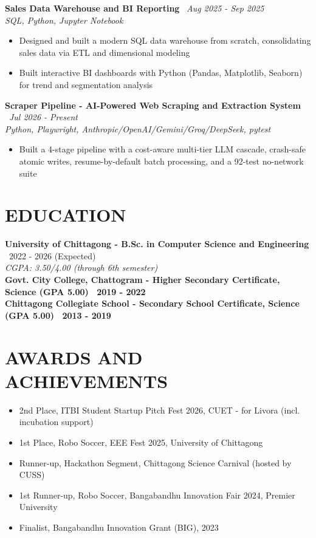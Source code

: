 \documentclass[10.5pt,a4paper]{article}
\newenvironment{tightitemize}{
  \begin{itemize}[leftmargin=15pt, itemsep=1pt, parsep=0pt, topsep=2pt]
}{
  \end{itemize}
}
\newcommand{\entry}[3]{%
  \textbf{#1} \textbar\ #2\\
  \textit{#3}%
}
\newcommand{\entrysimple}[2]{%
  \textbf{#1} \textbar\ \textit{#2}\\[1pt]
}
\newcommand{\entrybold}[2]{%
  \textbf{#1 \textbar\ #2}%
}
\begin{document}
\entrysimple{Sales Data Warehouse and BI Reporting}{Aug 2025 - Sep 2025}
\textit{SQL, Python, Jupyter Notebook}
\begin{tightitemize}
  \item Designed and built a modern SQL data warehouse from scratch, consolidating sales data via ETL and dimensional modeling
  \item Built interactive BI dashboards with Python (Pandas, Matplotlib, Seaborn) for trend and segmentation analysis
\end{tightitemize}

\entrysimple{Scraper Pipeline - AI-Powered Web Scraping and Extraction System}{Jul 2026 - Present}
\textit{Python, Playwright, Anthropic/OpenAI/Gemini/Groq/DeepSeek, pytest}
\begin{tightitemize}
  \item Built a 4-stage pipeline with a cost-aware multi-tier LLM cascade, crash-safe atomic writes, resume-by-default batch processing, and a 92-test no-network suite
\end{tightitemize}

\section*{EDUCATION}
\entry{University of Chittagong - B.Sc. in Computer Science and Engineering}{2022 - 2026 (Expected)}{CGPA: 3.50/4.00 (through 6th semester)}\\[4pt]
\entrybold{Govt. City College, Chattogram - Higher Secondary Certificate, Science (GPA 5.00)}{2019 - 2022}\\[2pt]
\entrybold{Chittagong Collegiate School - Secondary School Certificate, Science (GPA 5.00)}{2013 - 2019}

\section*{AWARDS AND ACHIEVEMENTS}
\begin{tightitemize}
  \item 2nd Place, ITBI Student Startup Pitch Fest 2026, CUET - for Livora (incl. incubation support)
  \item 1st Place, Robo Soccer, EEE Fest 2025, University of Chittagong
  \item Runner-up, Hackathon Segment, Chittagong Science Carnival (hosted by CUSS)
  \item 1st Runner-up, Robo Soccer, Bangabandhu Innovation Fair 2024, Premier University
  \item Finalist, Bangabandhu Innovation Grant (BIG), 2023
\end{tightitemize}
\end{document}
